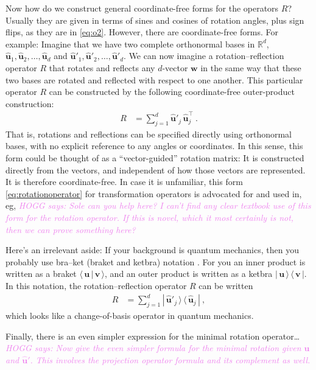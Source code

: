 \documentclass{article}
\newcommand{\Evec}[1]{{\mathbf{#1}}} %
\newcommand{\Ehat}[1]{{\mathbf{\hat{#1}}}} %
\newcommand{\braket}[2]{\langle\,{#1}\,|\,{#2}\,\rangle}
\newcommand{\ketbra}[2]{|\,{#1}\,\rangle\,\langle\,{#2}\,|}
\newcommand{\HOGG}[1]{\textcolor{violet}{\textsl{HOGG says: {#1}}}}
\begin{document}
Now how do we construct general coordinate-free forms for the operators $R$?
Usually they are given in terms of sines and cosines of rotation angles, plus sign flips, as they are in \eqref{eq:o2}.
However, there are coordinate-free forms.
For example: Imagine that we have two complete orthonormal bases in $\mathbb{R}^d$, $\Ehat{u}_1,\Ehat{u}_2,\ldots,\Ehat{u}_d$ and $\Ehat{u}'_1,\Ehat{u}'_2,\ldots,\Ehat{u}'_d$.
We can now imagine a rotation--reflection operator $R$ that rotates and reflects any $d$-vector $\Evec{w}$ in the same way that these two bases are rotated and reflected with respect to one another.
This particular operator $R$ can be constructed by the following coordinate-free outer-product construction:
\begin{align}
    R &= \sum_{j=1}^d \Ehat{u}'_j\,\Ehat{u}_j^\top ~.\label{eq:rotationoperator}
\end{align}
That is, rotations and reflections can be specified directly using orthonormal bases, with no explicit reference to any angles or coordinates.
In this sense, this form could be thought of as a ``vector-guided'' rotation matrix:
It is constructed directly from the vectors, and independent of how those vectors are represented.
It is therefore coordinate-free.
In case it is unfamiliar, this form \eqref{eq:rotationoperator} for transformation operators is advocated for and used in, eg, \HOGG{Sole can you help here? I can't find any clear textbook use of this form for the rotation operator. If this is novel, which it most certainly is not, then we can prove something here?}

Here's an irrelevant aside:
If your background is quantum mechanics, then you probably use bra--ket (braket and ketbra) notation \cite{dirac}.
For you an inner product is written as a braket $\braket{\Evec{u}}{\Evec{v}}$, and an outer product is written as a ketbra $\ketbra{\Evec{u}}{\Evec{v}}$.
In this notation, the rotation--reflection operator $R$ can be written 
\begin{align}
    R &= \sum_{j=1}^d \ketbra{\Ehat{u}'_j}{\Ehat{u}_j} ~,
\end{align}
which looks like a change-of-basis operator in quantum mechanics.

Finally, there is an even simpler expression for the minimal rotation operator\ldots
\HOGG{Now give the even simpler formula for the minimal rotation given $\Ehat{u}$ and $\Ehat{u}'$. This involves the projection operator formula and its complement as well.}
\end{document}
